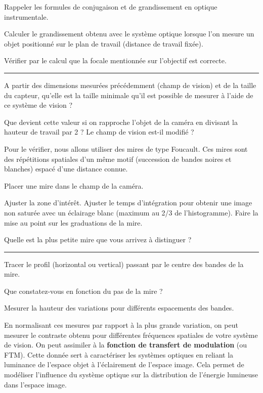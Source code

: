 \Quest Rappeler les formules de conjugaison et de grandissement en optique instrumentale.

\Quest Calculer le grandissement obtenu avec le système optique lorsque l'on mesure un objet positionné sur le plan de travail (distance de travail fixée).

\Quest Vérifier par le calcul que la focale mentionnée sur l'objectif est correcte.

\noindent \rule{\linewidth}{1pt}

\Quest A partir des dimensions mesurées précédemment (champ de vision) et de la taille du capteur, qu'elle est la taille minimale qu'il est possible de mesurer à l'aide de ce système de vision ?

\Quest Que devient cette valeur si on rapproche l'objet de la caméra en divisant la hauteur de travail par 2 ? Le champ de vision est-il modifié ?

\medskip

Pour le vérifier, nous allons utiliser des mires de type Foucault. Ces mires sont des répétitions spatiales d'un même motif (succession de bandes noires et blanches) espacé d'une distance connue.

\Manip Placer une mire dans le champ de la caméra.

\Manip Ajuster la zone d'intérêt. Ajuster le temps d'intégration pour obtenir une image non saturée avec un éclairage blanc (maximum au 2/3 de l'histogramme). Faire la mise au point sur les graduations de la mire.

\Quest Quelle est la plus petite mire que vous arrivez à distinguer ?

\noindent \rule{\linewidth}{1pt}

\Manip Tracer le profil (horizontal ou vertical) passant par le centre des bandes de la mire.

\Quest Que constatez-vous en fonction du pas de la mire ?

\Manip Mesurer la hauteur des variations pour différents espacements des bandes.

\medskip

En normalisant ces mesures par rapport à la plus grande variation, on peut mesurer le contraste obtenu pour différentes fréquences spatiales de votre système de vision. On peut assimiler à la \textbf{fonction de transfert de modulation} (ou FTM). Cette donnée sert à caractériser les systèmes optiques en reliant la luminance de l'espace objet à l'éclairement de l'espace image. Cela permet de modéliser l'influence du système optique sur la distribution de l'énergie lumineuse dans l'espace image.

